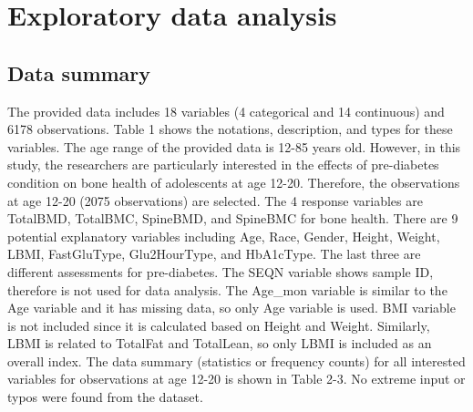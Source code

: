 \documentclass[11pt]{article}
\begin{document}
\section{Exploratory data analysis}
\subsection{Data summary}
The provided data includes 18 variables (4 categorical and 14 continuous) and 6178 observations. Table 1 shows the notations, description, and types for these variables. The age range of the provided data is 12-85 years old. However, in this study, the researchers are particularly interested in the effects of pre-diabetes condition on bone health of adolescents at age 12-20. Therefore, the observations at age 12-20 (2075 observations) are selected. The 4 response variables are TotalBMD, TotalBMC, SpineBMD, and SpineBMC for bone health. There are 9 potential explanatory variables including Age, Race, Gender, Height, Weight, LBMI, FastGluType, Glu2HourType, and HbA1cType. The last three are different assessments for pre-diabetes. The SEQN variable shows sample ID, therefore is not used for data analysis. The Age\_mon variable is similar to the Age variable and it has missing data, so only Age variable is used. BMI variable is not included since it is calculated based on Height and Weight. Similarly, LBMI is related to TotalFat and TotalLean, so only LBMI is included as an overall index. The data summary (statistics or frequency counts) for all interested variables for observations at age 12-20 is shown in Table 2-3. No extreme input or typos were found from the dataset.
\end{document}

